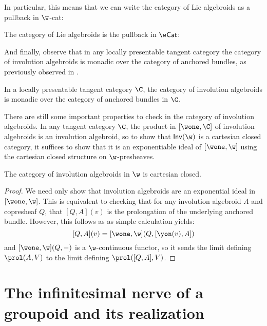 In particular, this means that we can write the category of Lie algebroids as a pullback in $\w$-cat:
\begin{corollary}
	The category of Lie algebroids is the pullback in $\w\mathsf{Cat}$:
    \[\]
\end{corollary}
And finally, observe that in any locally presentable tangent category the category of involution algebroids is monadic over the category of anchored bundles, as previously observed in \cite{Kapranov2007}.
\begin{corollary}
	In a locally presentable tangent category $\C$, the category of involution algebroids is monadic over the category of anchored bundles in $\C$.
\end{corollary}

There are still some important properties to check in the category of involution algebroids. 
In any tangent category $\C$, the product in $[\wone,\C]$ of involution algebroids is an involution algebroid, so to show that $\mathsf{Inv}(\w)$ is a cartesian closed category, it suffices to show that it is an exponentiable ideal of $[\wone,\w]$ using the cartesian closed structure on $\w$-presheaves.
\begin{proposition}
	The category of involution algebroids in $\w$ is cartesian closed. 
\end{proposition}
\begin{proof}
	We need only show that involution algebroids are an exponential ideal in $[\wone,\w]$.
	This is equivalent to checking that for any involution algebroid $A$ and copresheaf $Q$, that $[Q,A](v)$ is the prolongation of the underlying anchored bundle.
	However, this follows as as simple calculation yields:
	\[
		[Q,A](v) = [\wone, \w](Q, [\yon (v), A])
	\]
	and $[\wone,\w](Q,-)$ is a $\w$-continuous functor, so it sends the limit defining $\prol(A,V)$ to the limit defining $\prol([Q,A],V)$.
\end{proof}


\section{The infinitesimal nerve of a groupoid and its realization}%
\label{sec:inf-nerve-of-a-gpd}

